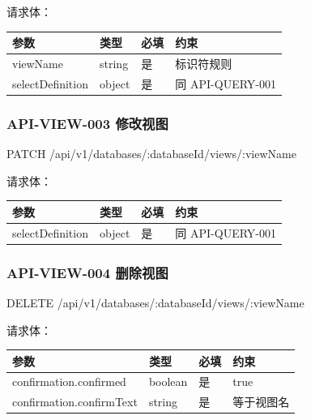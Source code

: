 \documentclass[
  a4paper,
  UTF8]{ctexart}
\newenvironment{Shaded}{}{}
\newcommand{\NormalTok}[1]{#1}
\begin{document}
请求体：

\begin{longtable}[]{@{}llll@{}}
\toprule
参数 & 类型 & 必填 & 约束 \\
\midrule
\endhead
viewName & string & 是 & 标识符规则 \\
selectDefinition & object & 是 & 同 API-QUERY-001 \\
\bottomrule
\end{longtable}

\hypertarget{api-view-003-ux4feeux6539ux89c6ux56fe}{%
\subsubsection{API-VIEW-003
修改视图}\label{api-view-003-ux4feeux6539ux89c6ux56fe}}

\begin{Shaded}
\begin{Highlighting}[]
\NormalTok{PATCH /api/v1/databases/:databaseId/views/:viewName}
\end{Highlighting}
\end{Shaded}

请求体：

\begin{longtable}[]{@{}llll@{}}
\toprule
参数 & 类型 & 必填 & 约束 \\
\midrule
\endhead
selectDefinition & object & 是 & 同 API-QUERY-001 \\
\bottomrule
\end{longtable}

\hypertarget{api-view-004-ux5220ux9664ux89c6ux56fe}{%
\subsubsection{API-VIEW-004
删除视图}\label{api-view-004-ux5220ux9664ux89c6ux56fe}}

\begin{Shaded}
\begin{Highlighting}[]
\NormalTok{DELETE /api/v1/databases/:databaseId/views/:viewName}
\end{Highlighting}
\end{Shaded}

请求体：

\begin{longtable}[]{@{}llll@{}}
\toprule
参数 & 类型 & 必填 & 约束 \\
\midrule
\endhead
confirmation.confirmed & boolean & 是 & true \\
confirmation.confirmText & string & 是 & 等于视图名 \\
\bottomrule
\end{longtable}
\end{document}
